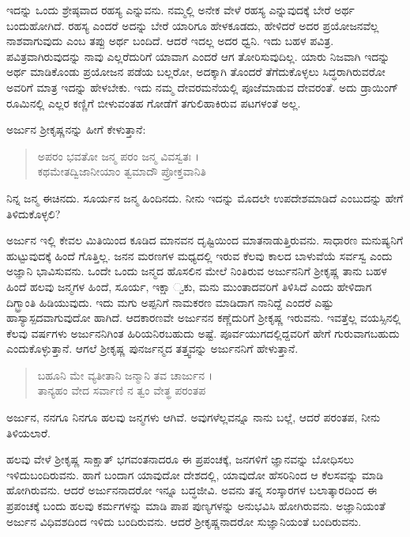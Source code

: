 ಇದನ್ನು ಒಂದು ಶ್ರೇಷ್ಠವಾದ ರಹಸ್ಯ ಎನ್ನುವನು. ನಮ್ಮಲ್ಲಿ ಅನೇಕ ವೇಳೆ ರಹಸ್ಯ ಎನ್ನುವುದಕ್ಕೆ ಬೇರೆ ಅರ್ಥ ಬಂದುಹೋಗಿದೆ. ರಹಸ್ಯ ಎಂದರೆ ಅದನ್ನು ಬೇರೆ ಯಾರಿಗೂ ಹೇಳಕೂಡದು, ಹೇಳಿದರೆ ಅದರ ಪ್ರಯೋಜನವೆಲ್ಲ ನಾಶವಾಗುವುದು ಎಂಬ ತಪ್ಪು ಅರ್ಥ ಬಂದಿದೆ. ಆದರೆ ಇದಲ್ಲ ಅದರ ಧ್ವನಿ. ಇದು ಬಹಳ ಪವಿತ್ರ. ಪವಿತ್ರವಾಗಿರುವುದನ್ನು ನಾವು ಎಲ್ಲರೆದುರಿಗೆ ಯಾವಾಗ ಎಂದರೆ ಆಗ ತೋರಿಸುವುದಿಲ್ಲ. ಯಾರು ನಿಜವಾಗಿ ಇದನ್ನು ಅರ್ಥ ಮಾಡಿಕೊಂಡು ಪ್ರಯೋಜನ ಪಡೆಯ ಬಲ್ಲರೋ, ಅದಕ್ಕಾಗಿ ತೊಂದರೆ ತೆಗೆದುಕೊಳ್ಳಲು ಸಿದ್ಧರಾಗಿರುವರೋ ಅವರಿಗೆ ಮಾತ್ರ ಇದನ್ನು ಹೇಳಬೇಕು. ಇದು ನಮ್ಮ ದೇವರಮನೆಯಲ್ಲಿ ಪೂಜೆಮಾಡುವ ದೇವರಂತೆ. ಅದು ಡ್ರಾಯಿಂಗ್ ರೂಮಿನಲ್ಲಿ ಎಲ್ಲರ ಕಣ್ಣಿಗೆ ಬೀಳುವಂತಹ ಗೋಡೆಗೆ ತಗುಲಿಹಾಕಿರುವ ಪಟಗಳಂತೆ ಅಲ್ಲ.

ಅರ್ಜುನ ಶ್ರೀಕೃಷ್ಣನನ್ನು ಹೀಗೆ ಕೇಳುತ್ತಾನೆ:

\begin{verse}
ಅಪರಂ ಭವತೋ ಜನ್ಮ ಪರಂ ಜನ್ಮ ವಿವಸ್ವತಃ ।\\ಕಥಮೇತದ್ವಿಜಾನೀಯಾಂ ತ್ವಮಾದೌ ಪ್ರೋಕ್ತವಾನಿತಿ 
\end{verse}

{\small ನಿನ್ನ ಜನ್ಮ ಈಚಿನದು. ಸೂರ್ಯನ ಜನ್ಮ ಹಿಂದಿನದು. ನೀನು ಇದನ್ನು ಮೊದಲೇ ಉಪದೇಶಮಾಡಿದೆ ಎಂಬುದನ್ನು ಹೇಗೆ ತಿಳಿದುಕೊಳ್ಳಲಿ?}

ಅರ್ಜುನ ಇಲ್ಲಿ ಕೇವಲ ಮಿತಿಯಿಂದ ಕೂಡಿದ ಮಾನವನ ದೃಷ್ಟಿಯಿಂದ ಮಾತನಾಡುತ್ತಿರುವನು. ಸಾಧಾರಣ ಮನುಷ್ಯನಿಗೆ ಹುಟ್ಟುವುದಕ್ಕೆ ಹಿಂದೆ ಗೊತ್ತಿಲ್ಲ. ಜನನ ಮರಣಗಳ ಮಧ್ಯದಲ್ಲಿ ಇರುವ ಕೆಲವು ಕಾಲದ ಬಾಳುವೆಯೆ ಸರ್ವಸ್ವ ಎಂದು ಅಜ್ಞಾನಿ ಭಾವಿಸುವನು. ಒಂದೇ ಒಂದು ಜನ್ಮದ ಹೊಸಲಿನ ಮೇಲೆ ನಿಂತಿರುವ ಅರ್ಜುನನಿಗೆ ಶ್ರೀಕೃಷ್ಣ ತಾನು ಬಹಳ ಹಿಂದೆ ಹಲವು ಜನ್ಮಗಳ ಹಿಂದೆ, ಸೂರ್ಯ, ಇಕ್ಷಾ ್ವಕು, ಮನು ಮುಂತಾದವರಿಗೆ ತಿಳಿಸಿದೆ ಎಂದು ಹೇಳಿದಾಗ ದಿಗ್ಭ್ರಾಂತಿ ಹಿಡಿಯುವುದು. ಇದು ಮಗು ಅಪ್ಪನಿಗೆ ನಾಮಕರಣ ಮಾಡಿದಾಗ ನಾನಿದ್ದೆ ಎಂದರೆ ಎಷ್ಟು ಹಾಸ್ಯಾಸ್ಪದವಾಗುವುದೋ ಹಾಗಿದೆ. ಆದಕಾರಣವೇ ಅರ್ಜುನನ ಕಣ್ಣೆದುರಿಗೆ ಶ್ರೀಕೃಷ್ಣ ಇರುವನು. ಇವತ್ತೆಲ್ಲ ವಯಸ್ಸಿನಲ್ಲಿ ಕೆಲವು ವರ್ಷಗಳು ಅರ್ಜುನನಿಗಿಂತ ಹಿರಿಯನಿರಬಹುದು ಅಷ್ಟೆ. ಪೂರ್ವಯುಗದಲ್ಲಿದ್ದವರಿಗೆ ಹೇಗೆ ಗುರುವಾಗಬಹುದು ಎಂದುಕೊಳ್ಳುತ್ತಾನೆ. ಆಗಲೆ ಶ್ರೀಕೃಷ್ಣ ಪುನರ್ಜನ್ಮದ ತತ್ತ್ವವನ್ನು ಅರ್ಜುನನಿಗೆ ಹೇಳುತ್ತಾನೆ.

\begin{verse}
ಬಹೂನಿ ಮೇ ವ್ಯತೀತಾನಿ ಜನ್ಮಾನಿ ತವ ಚಾರ್ಜುನ ।\\ತಾನ್ಯಹಂ ವೇದ ಸರ್ವಾಣಿ ನ ತ್ವಂ ವೇತ್ಥ ಪರಂತಪ 
\end{verse}

{\small ಅರ್ಜುನ, ನನಗೂ ನಿನಗೂ ಹಲವು ಜನ್ಮಗಳು ಆಗಿವೆ. ಅವುಗಳೆಲ್ಲವನ್ನೂ ನಾನು ಬಲ್ಲೆ, ಆದರೆ ಪರಂತಪ, ನೀನು ತಿಳಿಯಲಾರೆ.}

ಹಲವು ವೇಳೆ ಶ್ರೀಕೃಷ್ಣ ಸಾಕ್ಷಾತ್ ಭಗವಂತನಾದರೂ ಈ ಪ್ರಪಂಚಕ್ಕೆ, ಜನಗಳಿಗೆ ಜ್ಞಾನವನ್ನು ಬೋಧಿಸಲು ಇಳಿದುಬಂದಿರುವನು. ಹಾಗೆ ಬಂದಾಗ ಯಾವುದೋ ದೇಶದಲ್ಲಿ, ಯಾವುದೋ ಹೆಸರಿನಿಂದ ಆ ಕೆಲಸವನ್ನು ಮಾಡಿ ಹೋಗಿರುವನು. ಆದರೆ ಅರ್ಜುನನಾದರೋ ಇನ್ನೂ ಬದ್ಧಜೀವಿ. ಅವನು ತನ್ನ ಸಂಸ್ಕಾರಗಳ ಬಲಾತ್ಕಾರದಿಂದ ಈ ಪ್ರಪಂಚಕ್ಕೆ ಬಂದು ಹಲವು ಕರ್ಮಗಳನ್ನು ಮಾಡಿ ಪಾಪ ಪುಣ್ಯಗಳನ್ನು ಅನುಭವಿಸಿ ಹೋಗಿರುವನು. ಅಜ್ಞಾನಿಯಂತೆ ಅರ್ಜುನ ವಿಧಿವಶದಿಂದ ಇಳಿದು ಬಂದಿರುವನು. ಆದರೆ ಶ್ರೀಕೃಷ್ಣನಾದರೋ ಸುಜ್ಞಾನಿಯಂತೆ ಬಂದಿರುವನು.

